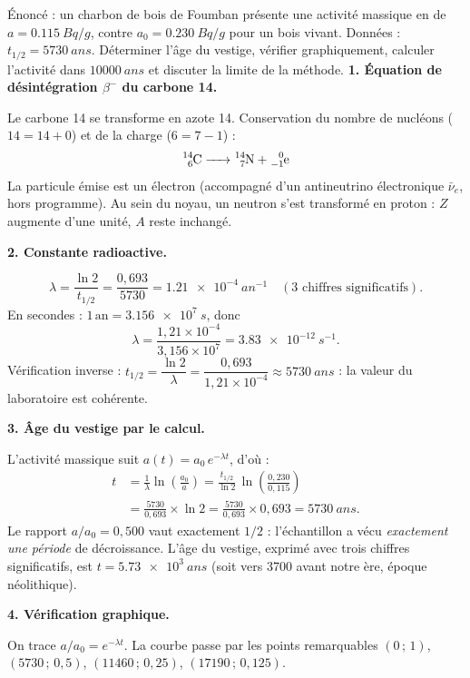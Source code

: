 \documentclass[11pt]{article}
\newcommand{\cle}[1]{{\popxbold\color{popdark}#1}}
\begin{document}
\begin{exoresolu}
Énoncé : un charbon de bois de Foumban présente une activité massique en  de $a = \SI{0,115}{Bq/g}$, contre $a_0 = \SI{0,230}{Bq/g}$ pour un bois vivant. Données : $t_{1/2} = \SI{5730}{ans}$. Déterminer l'âge du vestige, vérifier graphiquement, calculer l'activité dans $\SI{10000}{ans}$ et discuter la limite de la méthode.
\tcblower
\textbf{1. Équation de désintégration $\beta^-$ du carbone 14.}

Le carbone 14  se transforme en azote 14. Conservation du nombre de nucléons ($14 = 14 + 0$) et de la charge ($6 = 7 - 1$) :
\[ \ce{^{14}_{6}C -> ^{14}_{7}N + ^{0}_{-1}e} \]
La particule émise est un \cle{électron} (accompagné d'un antineutrino électronique $\bar{\nu}_e$, hors programme). Au sein du noyau, un neutron s'est transformé en proton : $Z$ augmente d'une unité, $A$ reste inchangé.

\textbf{2. Constante radioactive.}

\[ \lambda = \frac{\ln 2}{t_{1/2}} = \frac{0,693}{5730} = \SI{1,21e-4}{an^{-1}} \quad (\text{3 chiffres significatifs}). \]
En secondes : $1\,\text{an} = \SI{3,156e7}{s}$, donc
\[ \lambda = \frac{1,21\times 10^{-4}}{3,156\times 10^{7}} = \SI{3,83e-12}{s^{-1}}. \]
Vérification inverse : $t_{1/2} = \dfrac{\ln 2}{\lambda} = \dfrac{0,693}{1,21\times 10^{-4}} \approx \SI{5730}{ans}$ : la valeur du laboratoire est cohérente.

\textbf{3. Âge du vestige par le calcul.}

L'activité massique suit $a(t) = a_0\,e^{-\lambda t}$, d'où :
\begin{align*}
t &= \frac{1}{\lambda}\ln\!\left(\frac{a_0}{a}\right)
= \frac{t_{1/2}}{\ln 2}\,\ln\!\left(\frac{0,230}{0,115}\right) \\
&= \frac{5730}{0,693}\times \ln 2
= \frac{5730}{0,693}\times 0,693 = \SI{5730}{ans}.
\end{align*}
Le rapport $a/a_0 = 0,500$ vaut exactement $1/2$ : l'échantillon a vécu \emph{exactement une période} de décroissance. L'âge du vestige, exprimé avec trois chiffres significatifs, est $t = \SI{5,73e3}{ans}$ (soit vers 3700 avant notre ère, époque néolithique).

\textbf{4. Vérification graphique.}

On trace $a/a_0 = e^{-\lambda t}$. La courbe passe par les points remarquables $(0\,;\,1)$, $(5730\,;\,0,5)$, $(11460\,;\,0,25)$, $(17190\,;\,0,125)$.


\end{exoresolu}
\end{document}
